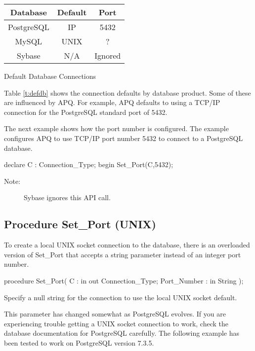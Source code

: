 \documentclass[english,letterpaper]{book}
\begin{document}
\begin{floatingtable}{
   \begin{tabular}{ccc}
   Database                &  Default  &  Port\\
   \hline 
   PostgreSQL              &  IP       &  5432\\
   MySQL                   &  UNIX     &  ?\\
   Sybase                  &  N/A      &  Ignored\\
   \end{tabular}}
   \caption{Default Database Connections}\label{t:defdb}
\end{floatingtable}

Table \ref{t:defdb} shows the connection defaults by database product. Some of these
are influenced by APQ. For example, APQ defaults to using a TCP/IP connection for the
PostgreSQL standard port of 5432.

The next example
shows how the port number is configured.
The example configures APQ to use TCP/IP 
port number 5432 to connect to
a PostgreSQL database.

\begin{Example}
declare
   C : Connection_Type;
begin
   Set_Port(C,5432);
\end{Example}

\begin{description}
\item [Note:]Sybase ignores this API call.
\end{description}

\subsection{Procedure Set\_Port (UNIX)}

To create a local UNIX socket connection to the database, there is
an overloaded version of Set\_Port that accepts a string parameter
instead of an integer port number.

\begin{Code}
procedure Set_Port(
   C :           in out Connection_Type;
   Port_Number : in     String
);
\end{Code}

Specify a null string for the connection 
to use the local UNIX socket default.

This parameter has changed somewhat as PostgreSQL evolves. If you
are experiencing trouble getting a UNIX socket connection to work,
check the database documentation for PostgreSQL carefully. The following
example has been tested to work on PostgreSQL version 7.3.5.
\end{document}
